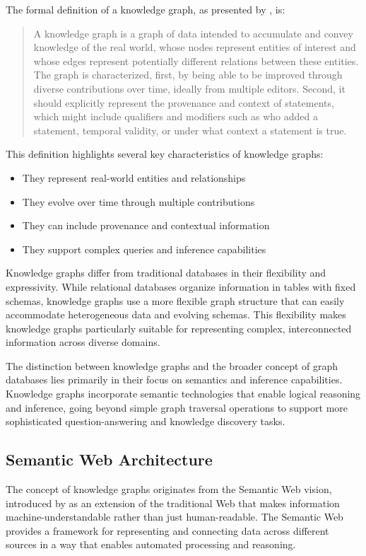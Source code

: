 The formal definition of a knowledge graph, as presented by \citet{hogan2021knowledge}, is:

\begin{quote}
A knowledge graph is a graph of data intended to accumulate and convey knowledge of the real world, whose nodes represent entities of interest and whose edges represent potentially different relations between these entities. The graph is characterized, first, by being able to be improved through diverse contributions over time, ideally from multiple editors. Second, it should explicitly represent the provenance and context of statements, which might include qualifiers and modifiers such as who added a statement, temporal validity, or under what context a statement is true.
\end{quote}

This definition highlights several key characteristics of knowledge graphs:
\begin{itemize}
    \item They represent real-world entities and relationships
    \item They evolve over time through multiple contributions
    \item They can include provenance and contextual information
    \item They support complex queries and inference capabilities
\end{itemize}

Knowledge graphs differ from traditional databases in their flexibility and expressivity. While relational databases organize information in tables with fixed schemas, knowledge graphs use a more flexible graph structure that can easily accommodate heterogeneous data and evolving schemas. This flexibility makes knowledge graphs particularly suitable for representing complex, interconnected information across diverse domains.

The distinction between knowledge graphs and the broader concept of graph databases lies primarily in their focus on semantics and inference capabilities. Knowledge graphs incorporate semantic technologies that enable logical reasoning and inference, going beyond simple graph traversal operations to support more sophisticated question-answering and knowledge discovery tasks.

\subsection{Semantic Web Architecture}
The concept of knowledge graphs originates from the Semantic Web vision, introduced by \citet{semweb2001} as an extension of the traditional Web that makes information machine-understandable rather than just human-readable. The Semantic Web provides a framework for representing and connecting data across different sources in a way that enables automated processing and reasoning.

